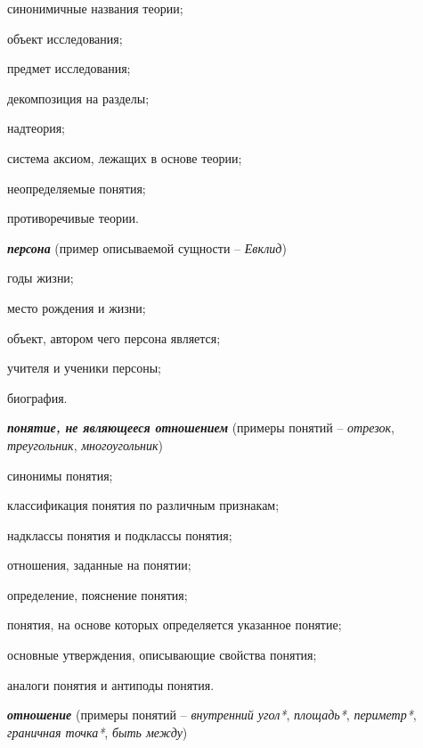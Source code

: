 \begin{textitemize}
	\item синонимичные названия теории;
	\item объект исследования;
	\item предмет исследования;
	\item декомпозиция на разделы;
	\item надтеория;
	\item система аксиом, лежащих в основе теории;
	\item неопределяемые понятия;
	\item противоречивые теории.
\end{textitemize}

\textbf{\textit{персона}} (пример описываемой сущности -- \textit{Евклид})

\begin{textitemize}
	\item годы жизни;
	\item место рождения и жизни;
	\item объект, автором чего персона является;
	\item учителя и ученики персоны;
	\item биография.
\end{textitemize}

\textbf{\textit{понятие, не являющееся отношением}} (примеры понятий -- \textit{отрезок}, \textit{треугольник}, \textit{многоугольник})

\begin{textitemize}
	\item синонимы понятия;
	\item классификация понятия по различным признакам;
	\item надклассы понятия и подклассы понятия;
	\item отношения, заданные на понятии;
	\item определение, пояснение понятия;
	\item понятия, на основе которых определяется указанное понятие;
	\item основные утверждения, описывающие свойства понятия;
	\item аналоги понятия и антиподы понятия.
\end{textitemize}

\textbf{\textit{отношение}} (примеры понятий -- \textit{внутренний угол*}, \textit{площадь*}, \textit{периметр*}, \textit{граничная точка*}, \textit{быть между\scnrolesign})

